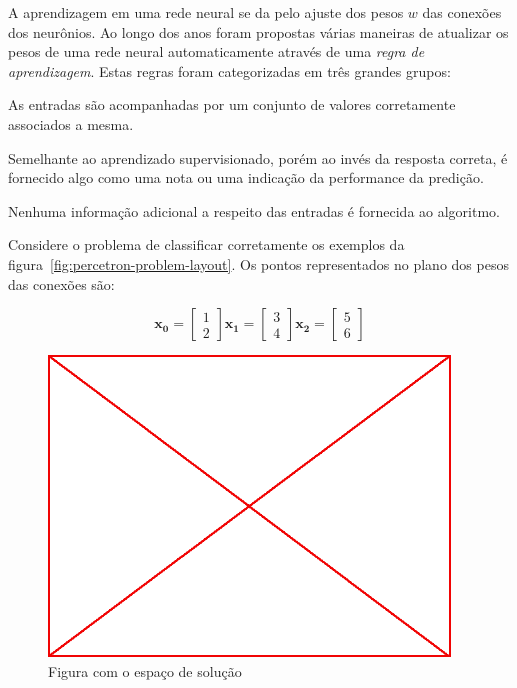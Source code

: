 A aprendizagem em uma rede neural se da pelo ajuste dos pesos $w$ das conexões
dos neurônios. Ao longo dos anos foram propostas várias maneiras de atualizar
os pesos de uma rede neural automaticamente através de uma \emph{regra de
  aprendizagem}. Estas regras foram categorizadas em três grandes grupos:

\begin{description}
  \itemsep1pt\parskip0pt

  \item[Aprendizagem Supervisionada] As entradas são acompanhadas por um
    conjunto de valores corretamente associados a mesma.

  \item[Aprendizagem Por Reforço] Semelhante ao aprendizado supervisionado,
    porém ao invés da resposta correta, é fornecido algo como uma nota ou uma
    indicação da performance da predição.

  \item[Aprendizagem Não Supervisionada] Nenhuma informação adicional a
    respeito das entradas é fornecida ao algoritmo.

\end{description}

Considere o problema de classificar corretamente os exemplos da
figura~\ref{fig:percetron-problem-layout}. Os pontos representados no plano dos
pesos das conexões são:

$$ \mathbf{x_0} =
\begin{bmatrix}
  1\\
  2
\end{bmatrix}
\mathbf{x_1} = \begin{bmatrix}
  3\\
  4
\end{bmatrix}
\mathbf{x_2} = \begin{bmatrix}
  5\\
  6
\end{bmatrix}
$$
\begin{figure}\label{fig:perceptron-problem-layout}
  \caption{Figura com o espaço de solução}
  \begin{center}
    \includegraphics[height=8cm]{placeholder}
  \end{center}
\end{figure}

